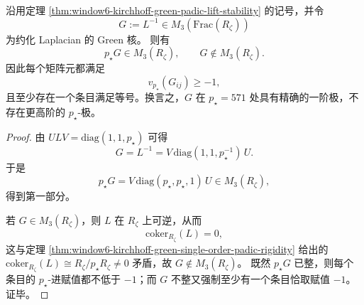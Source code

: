 \begin{corollary}\label{cor:window6-reduced-laplacian-green-simple-pole}
沿用定理 \ref{thm:window6-kirchhoff-green-padic-lift-stability} 的记号，并令
\[
G:=L^{-1}\in M_3(\mathrm{Frac}(R_\zeta))
\]
为约化 Laplacian 的 Green 核。
则有
\[
p_\star G\in M_3(R_\zeta),\qquad G\notin M_3(R_\zeta).
\]
因此每个矩阵元都满足
\[
v_{p_\star}(G_{ij})\ge -1,
\]
且至少存在一个条目满足等号。换言之，\(G\) 在 \(p_\star=571\) 处具有精确的一阶极，不存在更高阶的 \(p_\star\)-极。
\end{corollary}
\begin{proof}
由
\(
ULV=\mathrm{diag}(1,1,p_\star)
\)
可得
\[
G=L^{-1}=V\,\mathrm{diag}(1,1,p_\star^{-1})\,U.
\]
于是
\[
p_\star G
=
V\,\mathrm{diag}(p_\star,p_\star,1)\,U
\in M_3(R_\zeta),
\]
得到第一部分。
\par
若 \(G\in M_3(R_\zeta)\)，则 \(L\) 在 \(R_\zeta\) 上可逆，从而
\[
\mathrm{coker}_{R_\zeta}(L)=0,
\]
这与定理 \ref{thm:window6-kirchhoff-green-single-order-padic-rigidity} 给出的
\(
\mathrm{coker}_{R_\zeta}(L)\cong R_\zeta/p_\star R_\zeta\neq 0
\)
矛盾，故 \(G\notin M_3(R_\zeta)\)。
既然 \(p_\star G\) 已整，则每个条目的 \(p_\star\)-进赋值都不低于 \(-1\)；而 \(G\) 不整又强制至少有一个条目恰取赋值 \(-1\)。证毕。
\end{proof}
